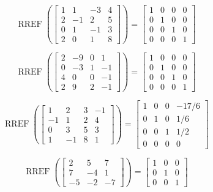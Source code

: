 \documentclass{article}
\DeclareMathOperator{\RREF}{RREF}
\begin{document}
\[
  \RREF\left(
    \begin{bmatrix} 
    1 & 1 & -3 & 4\\ 
    2 &-1 & 2 & 5 \\
    0 & 1 &-1 & 3 \\
    2 & 0 & 1 & 8
    \end{bmatrix}
  \right)
    =
  \begin{bmatrix} 1 & 0 &0 &0 \\ 0 & 1 & 0&0 \\ 0 & 0 & 1& 0 \\ 0 & 0 & 0 &1 \end{bmatrix}
\]




\[
  \RREF\left(
    \begin{bmatrix} 
2 & -9 & 0 & 1 \\
0 & -3 & 1 & -1\\
4 & 0 & 0 & -1\\
2 & 9 & 2 &-1
    \end{bmatrix}
  \right)
    =
\begin{bmatrix} 1 & 0 & 0 & 0 \\ 0 & 1 & 0 & 0 \\ 0 & 0 & 1 & 0 \\ 0 & 0 & 0 & 1 \end{bmatrix}
\]


\[
  \RREF\left(
    \begin{bmatrix} 
    1 & 2 & 3 & -1\\ 
    -1 &1 & 2 & 4 \\
    0 & 3 &5 & 3 \\
    1 & -1 & 8 & 1
    \end{bmatrix}
  \right)
    =
  \begin{bmatrix} 1 & 0 &0 & -17/6 \\ 0 & 1 & 0& 1/6 \\ 0 & 0 & 1& 1/2 \\ 0 & 0 & 0 &0 \end{bmatrix}
\]




\[\RREF\left(\begin{bmatrix} 
2 & 5 & 7 \\ 
7 & -4 & 1 \\
-5 & -2 & -7 
\end{bmatrix} \right)
= \begin{bmatrix} 1 & 0 &0 \\ 0 & 1 & 0 \\ 0 & 0 & 1\end{bmatrix}\]
\end{document}
